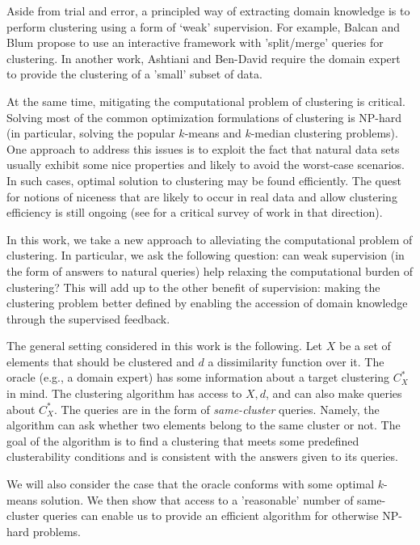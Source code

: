 \documentclass{article}
\begin{document}
Aside from trial and error, a principled way of extracting domain knowledge is to perform clustering using a form of `weak' supervision. For example, Balcan and Blum \cite{balcan2008clustering} propose to use an interactive framework with 'split/merge' queries for clustering. In another work, Ashtiani and Ben-David \cite{ashtiani2015representation} require the domain expert to provide the clustering of a 'small' subset of data.

At the same time, mitigating the computational problem of clustering is critical. Solving most of the common optimization formulations of clustering is NP-hard (in particular, solving the popular $k$-means and $k$-median clustering problems). One approach to address this issues is to exploit the fact that natural data sets usually exhibit some nice properties and likely to avoid the worst-case scenarios. In such cases, optimal solution to clustering may be found efficiently. The quest for notions of niceness that are likely to occur in real data and allow clustering efficiency is still ongoing (see \cite{Ben-David15} for a critical survey of work in that direction).

In this work, we take a new approach to alleviating the computational problem of clustering. In particular, we ask the following question: can weak supervision (in the form of answers to natural queries) help relaxing the computational burden of clustering? This will add up to the other benefit of supervision: making the clustering problem better defined by enabling the accession of domain knowledge through the supervised feedback.

The general setting considered in this work is the following. Let $X$ be a set of elements that should be clustered and $d$ a dissimilarity function over it. The oracle (e.g., a domain expert) has some information about a  target clustering $C^*_X$ in mind. The clustering algorithm has access to $X, d$, and can also make queries about $C^*_X$. The queries are in the form of \emph{same-cluster} queries. Namely, the algorithm can ask whether two elements belong to the same cluster or not. The goal of the algorithm is to find a clustering that meets some predefined clusterability conditions and is consistent with the answers given to its queries. 

We will also consider the case that the oracle conforms with some optimal $k$-means solution. We then show that access to a 'reasonable' number of same-cluster queries can enable us to provide an efficient algorithm for otherwise NP-hard problems. 
\end{document}
